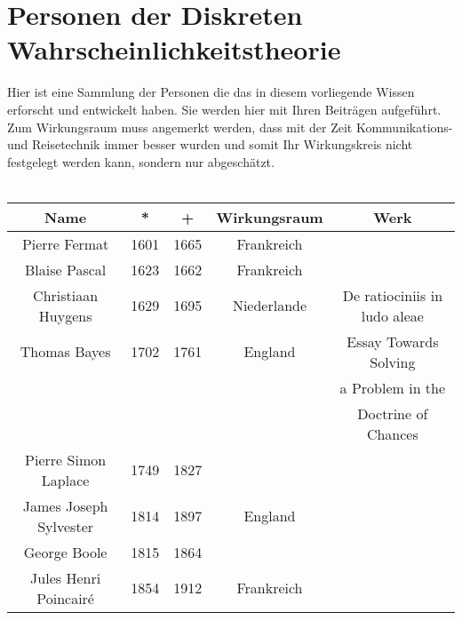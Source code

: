 \section{Personen der Diskreten Wahrscheinlichkeitstheorie}

Hier ist eine Sammlung der Personen die das in diesem vorliegende Wissen erforscht und entwickelt haben. Sie werden hier mit Ihren Beiträgen aufgeführt.
Zum Wirkungsraum muss angemerkt werden, dass mit der Zeit Kommunikations- und Reisetechnik immer besser wurden und somit Ihr Wirkungskreis nicht festgelegt werden kann, sondern nur abgeschätzt.\\
\\
\begin{tabular}{|c|c|c|c|c|}
\hline
Name & * & + & Wirkungsraum & Werk\\
\hline
\hline
Pierre Fermat & 1601& 1665&Frankreich&\\
\hline
Blaise Pascal & 1623& 1662 & Frankreich&\\
\hline
Christiaan Huygens & 1629 & 1695 & Niederlande & De ratiociniis in ludo aleae\\
\hline
Thomas Bayes & 1702 & 1761 & England & Essay Towards Solving\\
 &&&&a Problem in the \\
 &&&&Doctrine of Chances\\
\hline
Pierre Simon Laplace & 1749 & 1827 && \\
\hline
James Joseph Sylvester &1814&1897&England&\\
\hline
George Boole&1815&1864&&\\
\hline
Jules Henri Poincairé &1854&1912&Frankreich&\\
\hline
\end{tabular}